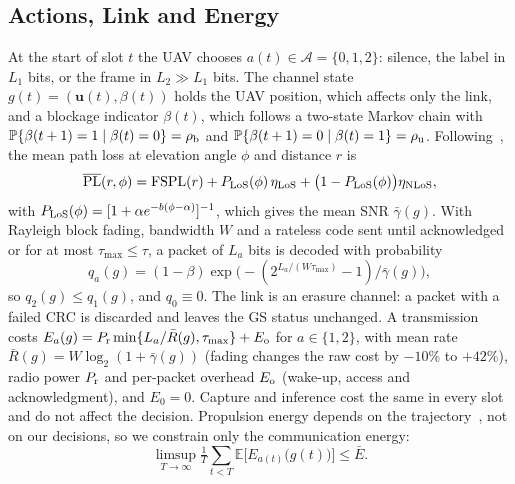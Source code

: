 \documentclass[conference]{IEEEtran}
\theoremstyle{remark}
\newcommand{\E}{\mathbb{E}}
\newcommand{\Prob}{\mathbb{P}}
\newcommand{\A}{\mathcal{A}}
\begin{document}
\subsection{Actions, Link and Energy}
At the start of slot $t$ the UAV chooses $a(t)\in\A=\{0,1,2\}$: silence, the label in $L_1$ bits, or the frame in $L_2\gg L_1$ bits. The channel state $g(t)=(\mathbf{u}(t),\beta(t))$ holds the UAV position, which affects only the link, and a blockage indicator $\beta(t)$, which follows a two-state Markov chain with $\Prob\{\beta(t+1)=1\mid\beta(t)=0\}=\rho_{\rm b}$ and $\Prob\{\beta(t+1)=0\mid\beta(t)=1\}=\rho_{\rm u}$. Following~\cite{alhourani2014lap}, the mean path loss at elevation angle $\phi$ and distance $r$ is
\begin{equation}\label{eq:pl}
\overline{\rm PL}(r,\phi)={\rm FSPL}(r)+P_{\rm LoS}(\phi)\,\eta_{\rm LoS}+\big(1-P_{\rm LoS}(\phi)\big)\eta_{\rm NLoS},
\end{equation}
with $P_{\rm LoS}(\phi)=[1+\alpha e^{-b(\phi-\alpha)}]^{-1}$, which gives the mean SNR $\bar\gamma(g)$. With Rayleigh block fading, bandwidth $W$ and a rateless code sent until acknowledged or for at most $\tau_{\max}\le\tau$, a packet of $L_a$ bits is decoded with probability
\begin{equation}\label{eq:succ}
q_a(g)=(1-\beta)\exp\big(-(2^{L_a/(W\tau_{\max})}-1)/\bar\gamma(g)\big),
\end{equation}
so $q_2(g)\le q_1(g)$, and $q_0\equiv0$. The link is an erasure channel: a packet with a failed CRC is discarded and leaves the GS status unchanged. A transmission costs $E_a(g)=P_{\rm r}\min\{L_a/\bar R(g),\tau_{\max}\}+E_{\rm o}$ for $a\in\{1,2\}$, with mean rate $\bar R(g)=W\log_2(1+\bar\gamma(g))$ (fading changes the raw cost by $-10\%$ to $+42\%$), radio power $P_{\rm r}$ and per-packet overhead $E_{\rm o}$ (wake-up, access and acknowledgment), and $E_0=0$. Capture and inference cost the same in every slot and do not affect the decision. Propulsion energy depends on the trajectory~\cite{zeng2019rotary}, not on our decisions, so we constrain only the communication energy:
\begin{equation}\label{eq:budget}
\limsup_{T\to\infty}\tfrac1T\textstyle\sum_{t<T}\E\Big[E_{a(t)}\big(g(t)\big)\Big]\le\bar E.
\end{equation}
\end{document}

